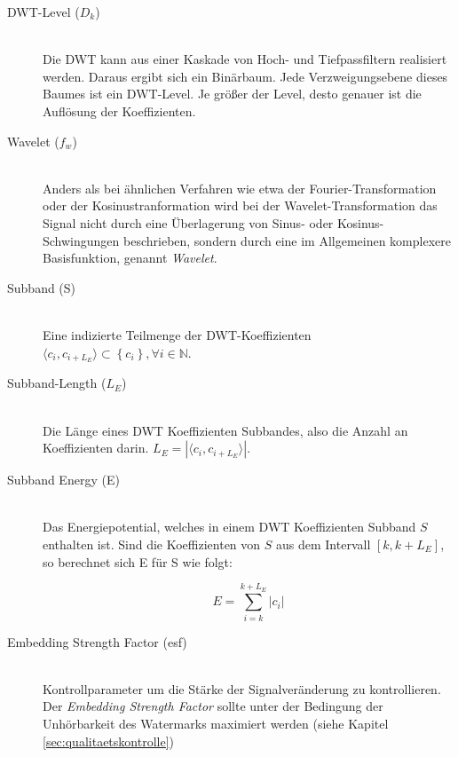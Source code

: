 \begin{description}
\item[DWT-Level (${D}_{k}$)] \hfill \\
Die DWT kann aus einer Kaskade von Hoch- und Tiefpassfiltern realisiert werden. Daraus ergibt sich ein Binärbaum. Jede Verzweigungsebene dieses Baumes ist ein DWT-Level. Je größer der Level, desto genauer ist die Auflösung der Koeffizienten. 

\item[Wavelet (${f}_{w}$)] \hfill \\
Anders als bei \"ahnlichen Verfahren wie etwa der Fourier-\-Transformation oder der Kosinus\-tranformation wird bei der Wavelet-Transformation das Signal nicht durch eine Überlagerung von Sinus- oder Kosinus-Schwingungen beschrieben, sondern durch eine im Allgemeinen komplexere Basisfunktion, genannt \textit{Wavelet}.
	
\item[Subband (S)] \hfill \\ 
Eine indizierte Teilmenge der DWT-Koeffizienten $\langle{c}_{i},{c}_{i+{L}_{E}}\rangle \subset \left\{{c}_{i}\right\}, \forall i \in \mathbb{N}$. 
	
\item[Subband-Length (${L}_{E}$)] \hfill \\ 
Die L\"ange eines DWT Koeffizienten Subbandes, also die Anzahl an Koeffizienten darin. ${L}_{E} = |\langle{c}_{i},{c}_{i+{L}_{E}}\rangle|$.

\item[Subband Energy (E)] \hfill \\ 
Das Energiepotential, welches in einem DWT Koeffizienten Subband $S$ enthalten ist. Sind die Koeffizienten von $S$ aus dem Intervall $[k, k+{L}_{E}]$, so berechnet sich E f\"ur S wie folgt:
	
	\begin{equation}
		E = \sum\limits_{i=k}^{k+{L}_{E}}|c_i| \label{equ:energy}
	\end{equation}
	
\item[Embedding Strength Factor (esf)] \hfill \\ 
Kontrollparameter um die Stärke der Signalveränderung zu kontrollieren. Der \textit{Embedding Strength Factor} sollte unter der Bedingung der Unhörbarkeit des Watermarks maximiert werden (siehe Kapitel \ref{sec:qualitaetskontrolle})
	

\end{description}
